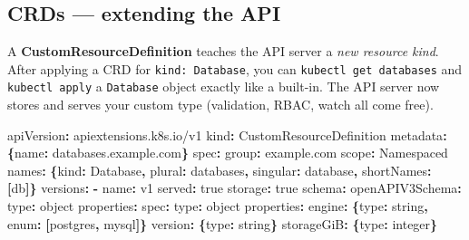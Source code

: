 \documentclass[11pt]{article}
\newenvironment{Shaded}{\begin{snugshade}}{\end{snugshade}}
\newcommand{\AttributeTok}[1]{\textcolor[rgb]{0.16,0.50,0.73}{#1}}
\newcommand{\CharTok}[1]{\textcolor[rgb]{0.24,0.68,0.91}{#1}}
\newcommand{\FunctionTok}[1]{\textcolor[rgb]{0.56,0.27,0.68}{#1}}
\newcommand{\KeywordTok}[1]{\textcolor[rgb]{0.81,0.81,0.76}{\textbf{#1}}}
\begin{document}
\subsection{CRDs --- extending the API}\label{crds--extending-the-api}

A \textbf{CustomResourceDefinition} teaches the API server a \emph{new resource kind}. After applying a CRD for \texttt{kind:\ Database}, you can \texttt{kubectl\ get\ databases} and \texttt{kubectl\ apply} a \texttt{Database} object exactly like a built-in. The API server now stores and serves your custom type (validation, RBAC, watch all come free).


\begin{Shaded}
\begin{Highlighting}[]
\FunctionTok{apiVersion}\KeywordTok{:}\AttributeTok{ apiextensions.k8s.io/v1}
\FunctionTok{kind}\KeywordTok{:}\AttributeTok{ CustomResourceDefinition}
\FunctionTok{metadata}\KeywordTok{:}\AttributeTok{ }\KeywordTok{\{}\FunctionTok{name}\KeywordTok{:}\AttributeTok{ databases.example.com}\KeywordTok{\}}
\FunctionTok{spec}\KeywordTok{:}
\AttributeTok{  }\FunctionTok{group}\KeywordTok{:}\AttributeTok{ example.com}
\AttributeTok{  }\FunctionTok{scope}\KeywordTok{:}\AttributeTok{ Namespaced}
\AttributeTok{  }\FunctionTok{names}\KeywordTok{:}\AttributeTok{ }\KeywordTok{\{}\FunctionTok{kind}\KeywordTok{:}\AttributeTok{ Database}\KeywordTok{,}\AttributeTok{ }\FunctionTok{plural}\KeywordTok{:}\AttributeTok{ databases}\KeywordTok{,}\AttributeTok{ }\FunctionTok{singular}\KeywordTok{:}\AttributeTok{ database}\KeywordTok{,}\AttributeTok{ }\FunctionTok{shortNames}\KeywordTok{:}\AttributeTok{ }\KeywordTok{[}\AttributeTok{db}\KeywordTok{]\}}
\AttributeTok{  }\FunctionTok{versions}\KeywordTok{:}
\AttributeTok{    }\KeywordTok{{-}}\AttributeTok{ }\FunctionTok{name}\KeywordTok{:}\AttributeTok{ v1}
\AttributeTok{      }\FunctionTok{served}\KeywordTok{:}\AttributeTok{ }\CharTok{true}
\AttributeTok{      }\FunctionTok{storage}\KeywordTok{:}\AttributeTok{ }\CharTok{true}
\AttributeTok{      }\FunctionTok{schema}\KeywordTok{:}
\AttributeTok{        }\FunctionTok{openAPIV3Schema}\KeywordTok{:}
\AttributeTok{          }\FunctionTok{type}\KeywordTok{:}\AttributeTok{ object}
\AttributeTok{          }\FunctionTok{properties}\KeywordTok{:}
\AttributeTok{            }\FunctionTok{spec}\KeywordTok{:}
\AttributeTok{              }\FunctionTok{type}\KeywordTok{:}\AttributeTok{ object}
\AttributeTok{              }\FunctionTok{properties}\KeywordTok{:}
\AttributeTok{                }\FunctionTok{engine}\KeywordTok{:}\AttributeTok{  }\KeywordTok{\{}\FunctionTok{type}\KeywordTok{:}\AttributeTok{ string}\KeywordTok{,}\AttributeTok{ }\FunctionTok{enum}\KeywordTok{:}\AttributeTok{ }\KeywordTok{[}\AttributeTok{postgres}\KeywordTok{,}\AttributeTok{ mysql}\KeywordTok{]\}}
\AttributeTok{                }\FunctionTok{version}\KeywordTok{:}\AttributeTok{ }\KeywordTok{\{}\FunctionTok{type}\KeywordTok{:}\AttributeTok{ string}\KeywordTok{\}}
\AttributeTok{                }\FunctionTok{storageGiB}\KeywordTok{:}\AttributeTok{ }\KeywordTok{\{}\FunctionTok{type}\KeywordTok{:}\AttributeTok{ integer}\KeywordTok{\}}
\end{Highlighting}
\end{Shaded}
\end{document}
